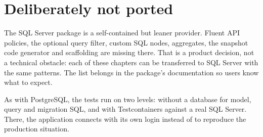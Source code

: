 \section{Deliberately not ported}

The SQL Server package is a self-contained but leaner provider. Fluent API policies, the optional
query filter, custom SQL nodes, aggregates, the snapshot code generator and scaffolding are
missing there. That is a product decision, not a technical obstacle: each of these chapters
can be transferred to SQL Server with the same patterns. The list belongs in the package's
documentation so users know what to expect.


As with PostgreSQL, the tests run on two levels: without a database for model, query and
migration SQL, and with Testcontainers against a real SQL Server. There, the application
connects with its own login instead of  to reproduce the production situation.
